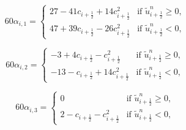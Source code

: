 \begin{equation*}
	60\alpha_{i,1} =  
    	\begin{cases}
		27 - 41c_{i+\frac{1}{2}} + 14c_{i+\frac{1}{2}}^2 & \text{if } \tilde{u}_{i+\frac{1}{2}}^n \geq 0,\\
		47 + 39c_{i+\frac{1}{2}} - 26c_{i+\frac{1}{2}}^2 & \text{if } \tilde{u}_{i+\frac{1}{2}}^n<0,
    	\end{cases}
\end{equation*}

\begin{equation*}
	60\alpha_{i,2} =  
    	\begin{cases}
		-3 +  4c_{i+\frac{1}{2}} - c_{i+\frac{1}{2}}^2 
		& \text{if } \tilde{u}_{i+\frac{1}{2}}^n \geq 0,\\
		-13 - c_{i+\frac{1}{2}} +  14c_{i+\frac{1}{2}}^2 & \text{if } \tilde{u}_{i+\frac{1}{2}}^n<0,
    	\end{cases}
\end{equation*}

\begin{equation*}
	60\alpha_{i,3} =  
    	\begin{cases}
		0 & \text{if } \tilde{u}_{i+\frac{1}{2}}^n \geq 0,\\
		2-c_{i+\frac{1}{2}}-   c_{i+\frac{1}{2}}^2 & \text{if } \tilde{u}_{i+\frac{1}{2}}^n<0,
    	\end{cases}
\end{equation*}

